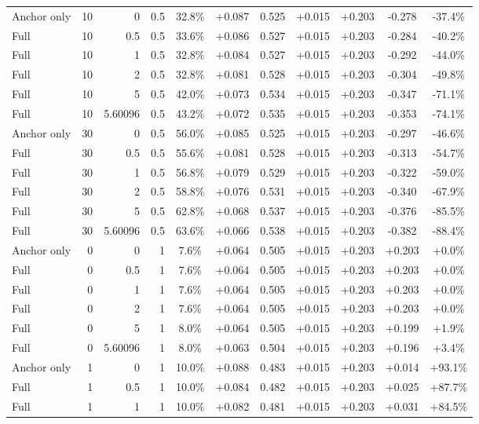 \begin{table}[htbp]
\begin{tabular}{lrrrccccccc}
Anchor only & 10 & 0 & 0.5 & 32.8\% & +0.087 & 0.525 & +0.015 & +0.203 & -0.278 & -37.4\% \\
Full & 10 & 0.5 & 0.5 & 33.6\% & +0.086 & 0.527 & +0.015 & +0.203 & -0.284 & -40.2\% \\
Full & 10 & 1 & 0.5 & 32.8\% & +0.084 & 0.527 & +0.015 & +0.203 & -0.292 & -44.0\% \\
Full & 10 & 2 & 0.5 & 32.8\% & +0.081 & 0.528 & +0.015 & +0.203 & -0.304 & -49.8\% \\
Full & 10 & 5 & 0.5 & 42.0\% & +0.073 & 0.534 & +0.015 & +0.203 & -0.347 & -71.1\% \\
Full & 10 & 5.60096 & 0.5 & 43.2\% & +0.072 & 0.535 & +0.015 & +0.203 & -0.353 & -74.1\% \\
Anchor only & 30 & 0 & 0.5 & 56.0\% & +0.085 & 0.525 & +0.015 & +0.203 & -0.297 & -46.6\% \\
Full & 30 & 0.5 & 0.5 & 55.6\% & +0.081 & 0.528 & +0.015 & +0.203 & -0.313 & -54.7\% \\
Full & 30 & 1 & 0.5 & 56.8\% & +0.079 & 0.529 & +0.015 & +0.203 & -0.322 & -59.0\% \\
Full & 30 & 2 & 0.5 & 58.8\% & +0.076 & 0.531 & +0.015 & +0.203 & -0.340 & -67.9\% \\
Full & 30 & 5 & 0.5 & 62.8\% & +0.068 & 0.537 & +0.015 & +0.203 & -0.376 & -85.5\% \\
Full & 30 & 5.60096 & 0.5 & 63.6\% & +0.066 & 0.538 & +0.015 & +0.203 & -0.382 & -88.4\% \\
Anchor only & 0 & 0 & 1 & 7.6\% & +0.064 & 0.505 & +0.015 & +0.203 & +0.203 & +0.0\% \\
Full & 0 & 0.5 & 1 & 7.6\% & +0.064 & 0.505 & +0.015 & +0.203 & +0.203 & +0.0\% \\
Full & 0 & 1 & 1 & 7.6\% & +0.064 & 0.505 & +0.015 & +0.203 & +0.203 & +0.0\% \\
Full & 0 & 2 & 1 & 7.6\% & +0.064 & 0.505 & +0.015 & +0.203 & +0.203 & +0.0\% \\
Full & 0 & 5 & 1 & 8.0\% & +0.064 & 0.505 & +0.015 & +0.203 & +0.199 & +1.9\% \\
Full & 0 & 5.60096 & 1 & 8.0\% & +0.063 & 0.504 & +0.015 & +0.203 & +0.196 & +3.4\% \\
Anchor only & 1 & 0 & 1 & 10.0\% & +0.088 & 0.483 & +0.015 & +0.203 & +0.014 & +93.1\% \\
Full & 1 & 0.5 & 1 & 10.0\% & +0.084 & 0.482 & +0.015 & +0.203 & +0.025 & +87.7\% \\
Full & 1 & 1 & 1 & 10.0\% & +0.082 & 0.481 & +0.015 & +0.203 & +0.031 & +84.5\% \\

\end{tabular}
\end{table}
